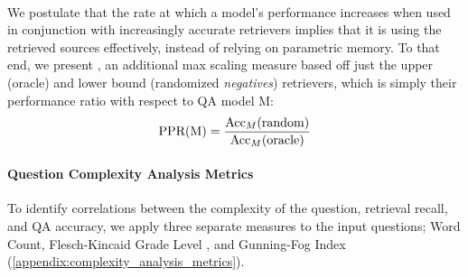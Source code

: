 \paragraph{\ppr}
We postulate that the rate at which a model's performance increases when used in conjunction with increasingly accurate retrievers implies that it is using the retrieved sources effectively, instead of relying on parametric memory. To that end, we present \PPR, an additional max scaling measure based off just the upper (oracle) and lower bound (randomized \textit{negatives}) retrievers, which is simply their performance ratio with respect to QA model M:
\begin{equation}
\label{eq:PPR}
\text{PPR}(\text{M}) = \frac{\text{Acc}_M(\text{random})}{\text{Acc}_M(\text{oracle})}
\end{equation}


\paragraph{Question Complexity Analysis Metrics}
To identify correlations between the complexity of the question, retrieval recall, and QA accuracy, we apply three separate measures to the input questions; Word Count, Flesch-Kincaid Grade Level \citep{flesch2007flesch}, and Gunning-Fog Index \citep{gunning1952technique}(\autoref{appendix:complexity_analysis_metrics}).

